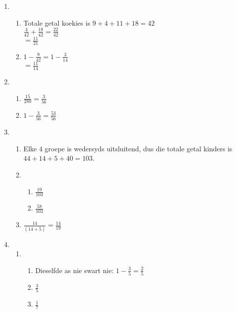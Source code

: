 \begin{eocsolutions}{}
{\begin{enumerate}[itemsep=5pt, label=\textbf{\arabic*}. ]
\begin{enumerate}[noitemsep, label=\textbf{(\alph*)} ]
    \item $1 - \frac{1}{9} = \frac{8}{9}$
    \item $\frac{1}{9} + \frac{4}{9} = \frac{5}{9}$
    \item $1 - \frac{5}{9} = \frac{4}{9}$
    \end{enumerate}
\item %
    \begin{enumerate}[noitemsep, label=\textbf{(\alph*)} ]
    \item Totale getal koekies is $9 + 4 + 11 + 18 = 42$\\
    $\frac{4}{42} + \frac{18}{42} = \frac{22}{42}$\\
    $=\frac{11}{21}$
    \item $1 - \frac{9}{42} = 1 - \frac{3}{14}$\\
    $=\frac{11}{14}$
    \end{enumerate}
\item %
    \begin{enumerate}[noitemsep, label=\textbf{(\alph*)} ]
    \item $\frac{15}{280} = \frac{3}{56}$
    \item $1 - \frac{3}{56} = \frac{53}{56}$
    \end{enumerate}
\item %
    \begin{enumerate}[noitemsep, label=\textbf{(\alph*)} ]
    \item Elke $4$ groepe is wedersyds uitsluitend, dus die totale getal kinders is $44 + 14 + 5 + 40 = 103$.
    \item
	\begin{enumerate}[itemsep=1pt,  label=\textbf{\roman*}. ]
	\item $\frac{19}{103}$
	\item $\frac{58}{103}$
	\end{enumerate}
    \item $\frac{14}{(14 + 5)} = \frac{14}{19}$
    \end{enumerate}
\item %
    \begin{enumerate}[noitemsep, label=\textbf{(\alph*)} ]
    \item 
	\begin{enumerate}[itemsep=1pt,  label=\textbf{\roman*}. ]
	\item Dieselfde as nie swart nie: $1 - \frac{3}{5} = \frac{2}{5}$
	\item $\frac{3}{5}$
	\item $\frac{1}{7}$

\end{enumerate}
\end{enumerate}
\end{enumerate}}
\end{eocsolutions}
